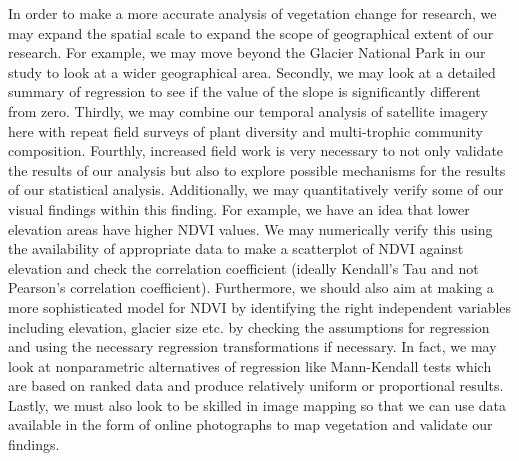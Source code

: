 \documentclass[11pt]{article}
\begin{document}
In order to make a more accurate analysis of vegetation change for research, we may expand
the spatial scale to expand the scope of geographical extent of our research. For example, we may move beyond the Glacier National Park in our study to look at a wider geographical area.
Secondly, we may look at a detailed summary of regression to see if the value of the slope is
significantly different from zero. Thirdly, we may combine our temporal analysis of satellite
imagery here with repeat field surveys of plant diversity and multi-trophic community
composition. Fourthly, increased field work is very necessary to not only validate the results of
our analysis but also to explore possible mechanisms for the results of our statistical analysis.
Additionally, we may quantitatively verify some of our visual findings within this finding. For
example, we have an idea that lower elevation areas have higher NDVI values. We may
numerically verify this using the availability of appropriate data to make a scatterplot of NDVI
against elevation and check the correlation coefficient (ideally Kendall’s Tau and not Pearson’s
correlation coefficient). Furthermore, we should also aim at making a more sophisticated model
for NDVI by identifying the right independent variables including elevation, glacier size etc. by
checking the assumptions for regression and using the necessary regression transformations if
necessary. In fact, we may look at nonparametric alternatives of regression like Mann-Kendall
tests which are based on ranked data and produce relatively uniform or proportional results.
Lastly, we must also look to be skilled in image mapping so that we can use data available in
the form of online photographs to map vegetation and validate our findings.\\
\end{document}
